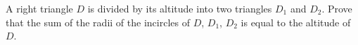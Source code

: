 A right triangle $D$ is divided by its altitude into two triangles $D_1$ and $D_2$. Prove that the sum of the radii of the incircles of $D$, $D_1$, $D_2$ is equal to the altitude of $D$.
